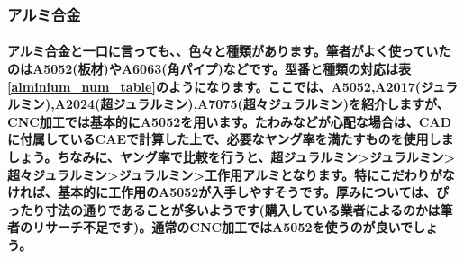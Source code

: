 \documentclass[b5paper, 9pt, twocolumn, titlepage,openany]{jsbook}%
\begin{document}
\subsubsection{アルミ合金}

\paragraph{アルミ合金と一口に言っても、、色々と種類があります。筆者がよく使っていたのはA5052(板材)やA6063(角パイプ)などです。型番と種類の対応は表\ref{alminium_num_table}のようになります。ここでは、A5052,A2017(ジュラルミン),A2024(超ジュラルミン),A7075(超々ジュラルミン)を紹介しますが、CNC加工では基本的にA5052を用います。たわみなどが心配な場合は、CADに付属しているCAEで計算した上で、必要なヤング率を満たすものを使用しましょう。ちなみに、ヤング率で比較を行うと、超ジュラルミン>ジュラルミン>超々ジュラルミン>ジュラルミン>工作用アルミとなります。特にこだわりがなければ、基本的に工作用のA5052が入手しやすそうです。厚みについては、ぴったり寸法の通りであることが多いようです(購入している業者によるのかは筆者のリサーチ不足です)。通常のCNC加工ではA5052を使うのが良いでしょう。}
\end{document}
